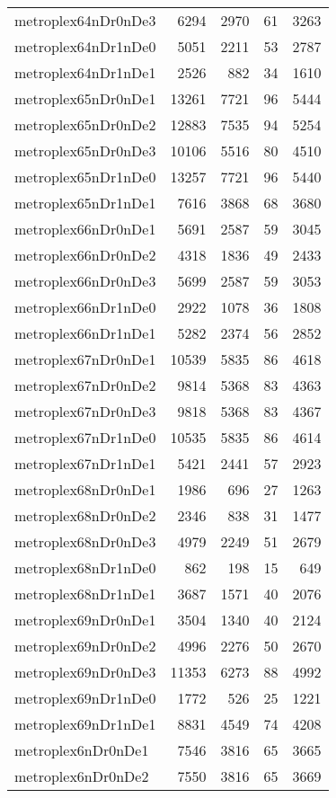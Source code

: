 \begin{longtable}{lrrrr}
metroplex64nDr0nDe3 & 6294 & 2970 & 61 & 3263 \\
metroplex64nDr1nDe0 & 5051 & 2211 & 53 & 2787 \\
metroplex64nDr1nDe1 & 2526 & 882 & 34 & 1610 \\
metroplex65nDr0nDe1 & 13261 & 7721 & 96 & 5444 \\
metroplex65nDr0nDe2 & 12883 & 7535 & 94 & 5254 \\
metroplex65nDr0nDe3 & 10106 & 5516 & 80 & 4510 \\
metroplex65nDr1nDe0 & 13257 & 7721 & 96 & 5440 \\
metroplex65nDr1nDe1 & 7616 & 3868 & 68 & 3680 \\
metroplex66nDr0nDe1 & 5691 & 2587 & 59 & 3045 \\
metroplex66nDr0nDe2 & 4318 & 1836 & 49 & 2433 \\
metroplex66nDr0nDe3 & 5699 & 2587 & 59 & 3053 \\
metroplex66nDr1nDe0 & 2922 & 1078 & 36 & 1808 \\
metroplex66nDr1nDe1 & 5282 & 2374 & 56 & 2852 \\
metroplex67nDr0nDe1 & 10539 & 5835 & 86 & 4618 \\
metroplex67nDr0nDe2 & 9814 & 5368 & 83 & 4363 \\
metroplex67nDr0nDe3 & 9818 & 5368 & 83 & 4367 \\
metroplex67nDr1nDe0 & 10535 & 5835 & 86 & 4614 \\
metroplex67nDr1nDe1 & 5421 & 2441 & 57 & 2923 \\
metroplex68nDr0nDe1 & 1986 & 696 & 27 & 1263 \\
metroplex68nDr0nDe2 & 2346 & 838 & 31 & 1477 \\
metroplex68nDr0nDe3 & 4979 & 2249 & 51 & 2679 \\
metroplex68nDr1nDe0 & 862 & 198 & 15 & 649 \\
metroplex68nDr1nDe1 & 3687 & 1571 & 40 & 2076 \\
metroplex69nDr0nDe1 & 3504 & 1340 & 40 & 2124 \\
metroplex69nDr0nDe2 & 4996 & 2276 & 50 & 2670 \\
metroplex69nDr0nDe3 & 11353 & 6273 & 88 & 4992 \\
metroplex69nDr1nDe0 & 1772 & 526 & 25 & 1221 \\
metroplex69nDr1nDe1 & 8831 & 4549 & 74 & 4208 \\
metroplex6nDr0nDe1 & 7546 & 3816 & 65 & 3665 \\
metroplex6nDr0nDe2 & 7550 & 3816 & 65 & 3669 \\

\end{longtable}
